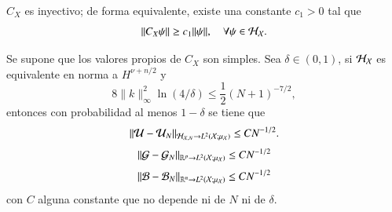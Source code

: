 \begin{lema}
    $C_X$ es inyectivo; de forma equivalente, existe una constante $c_1 > 0$ tal que
    \[
    \| C_X \psi \| \geq c_1 \| \psi \|, \quad \forall \psi \in \mathcal{H}_{\mathcal{X}}.
    \]
\end{lema}

\begin{teo}
    Se supone que los valores propios de $C_X$ son simples. Sea $\delta \in (0, 1)$,  si $\mathcal{H}_{\mathcal{X}}$ es equivalente en norma a $H^{\nu + n/2}$ y
    \[
    8\|k\|^2_\infty \ln(4/\delta) \leq \frac{1}{2} (N+1)^{-7/2},
    \]
    entonces con probabilidad al menos $1-\delta$ se tiene que
    \begin{equation*}
        \| \mathcal{U} - \mathcal{U}_N \|_{\mathcal{H}_{\mathcal{X}, N} \to L^2(\mathcal{X}; \mu_{\mathcal{X}})} \leq C N^{-1/2}.
    \end{equation*}
    \begin{equation*}
        \| \mathcal{G} - \mathcal{G}_N \|_{\mathbb{R}^p \to L^2(\mathcal{X}; \mu_{\mathcal{X}})} \leq C N^{-1/2}
    \end{equation*}
    \begin{equation*}
        \| \mathcal{B} - \mathcal{B}_N \|_{\mathbb{R}^n \to L^2(\mathcal{X}; \mu_{\mathcal{X}})} \leq C N^{-1/2}
    \end{equation*}
    con $C$ alguna constante que no depende ni de $N$ ni de $\delta$.
    \label{teo:error_koop_sqrt_N_1}
\end{teo}

